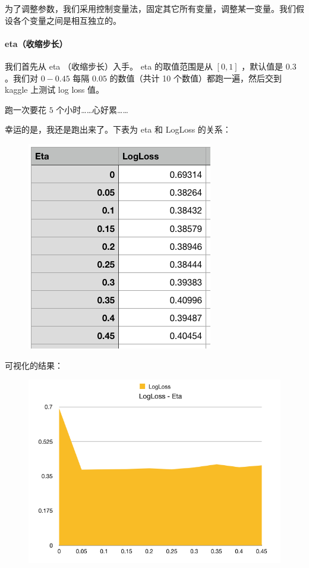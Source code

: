 \documentclass{article}
\begin{document}
为了调整参数，我们采用控制变量法，固定其它所有变量，调整某一变量。我们假设各个变量之间是相互独立的。

\paragraph{eta（收缩步长）}

我们首先从 eta （收缩步长）入手。 eta 的取值范围是从 $[0, 1]$ ，默认值是 $0.3$ 。我们对 $0 - 0.45$ 每隔 $0.05$ 的数值（共计 10 个数值）都跑一遍，然后交到 kaggle 上测试 log loss 值。

跑一次要花 $5$ 个小时……心好累……

幸运的是，我还是跑出来了。下表为 eta 和 LogLoss 的关系：

\begin{figure}[!h]
\centering
\includegraphics[scale=0.45]{tu2.png}
\end{figure}

可视化的结果：

\begin{figure}[!h]
\centering
\includegraphics[scale=0.5]{tu1.png}
\end{figure}
\end{document}
